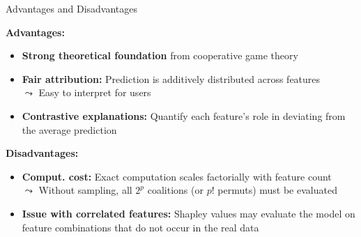 \documentclass[10pt,compress,t,notes=noshow, xcolor=table]{beamer}
\begin{document}
\begin{frame}{Advantages and Disadvantages}

\textbf{Advantages:}
\begin{itemize}%
  \item \textbf{Strong theoretical foundation} from cooperative game theory
  \item \textbf{Fair attribution:} Prediction is additively distributed across features\\
  $\leadsto$ Easy to interpret for users
  \item \textbf{Contrastive explanations:} Quantify each feature's role in deviating from the average prediction
\end{itemize}

\vspace{0.3cm}

\textbf{Disadvantages:}
\begin{itemize}%
  \item \textbf{Comput. cost:} Exact computation scales factorially with feature count\\
  $\leadsto$  Without sampling, all $2^p$ coalitions (or $p!$ permuts) must be evaluated
  \item \textbf{Issue with correlated features:} Shapley values may evaluate the model on feature combinations that do not occur in the real data
\end{itemize}

\end{frame}


\endlecture
\end{document}
